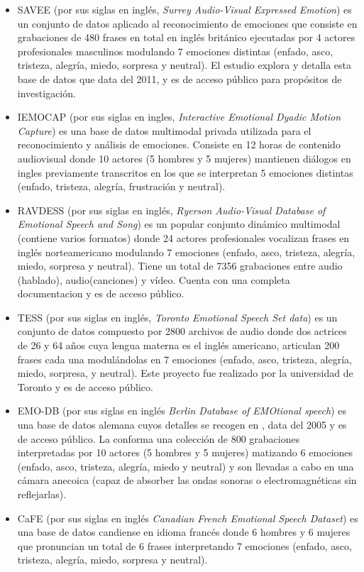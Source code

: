 \documentclass[11pt,a4paper,spanish]{book}
\begin{document}
	\begin{itemize}
		\item SAVEE (por sus siglas en inglés, \emph{ Surrey Audio-Visual Expressed Emotion}) es un conjunto de datos aplicado al reconocimiento de emociones que consiste en grabaciones de 480 frases en total en inglés británico ejecutadas por 4 actores profesionales masculinos modulando 7 emociones distintas (enfado, asco, tristeza, alegría, miedo, sorpresa y neutral). El estudio \cite{SAVEEdataset} explora y detalla esta base de datos que data del 2011, y es de acceso público para propósitos de investigación.
		
		\item IEMOCAP (por sus siglas en ingles, \emph{Interactive Emotional Dyadic Motion Capture}) es una base de datos multimodal privada utilizada para el reconocimiento y análisis de emociones. Consiste en 12 horas de contenido audiovisual donde 10 actores (5 hombres y 5 mujeres) mantienen diálogos en ingles previamente transcritos en los que se interpretan 5 emociones distintas (enfado, tristeza, alegría, frustración y neutral).
		
		\item RAVDESS (por sus siglas en inglés, \emph{Ryerson Audio-Visual Database of Emotional Speech and Song}) es un popular conjunto dinámico multimodal (contiene varios formatos) donde 24 actores profesionales vocalizan frases en inglés norteamericano modulando 7 emociones (enfado, asco, tristeza, alegría, miedo, sorpresa y neutral). Tiene un total de 7356 grabaciones entre audio (hablado), audio(canciones) y vídeo. Cuenta con una completa documentacion \cite{Livingstone2018} y es de acceso público.
		
		\item TESS (por sus siglas en inglés, \emph{Toronto Emotional Speech Set data}) es un conjunto de datos compuesto por 2800 archivos de audio donde dos actrices de 26 y 64 años cuya lengua materna es el inglés americano, articulan 200 frases cada una modulándolas en 7 emociones (enfado, asco, tristeza, alegría, miedo, sorpresa, y neutral). Este proyecto fue realizado por la universidad de Toronto \cite{SP2/E8H2MF_2020} y es de acceso público.
		
		\item EMO-DB (por sus siglas en inglés \emph{Berlin Database of EMOtional speech}) es una base de datos alemana cuyos detalles se recogen en \cite{emodb2005}, data del 2005 y es de acceso público. La conforma una colección de 800 grabaciones interpretadas por 10 actores (5 hombres y 5 mujeres) matizando 6 emociones (enfado, asco, tristeza, alegría, miedo y neutral) y son llevadas a cabo en una cámara anecoica (capaz de absorber las ondas sonoras o electromagnéticas sin reflejarlas).
		
		\item CaFE (por sus siglas en inglés \emph{Canadian French Emotional Speech Dataset}) es una base de datos candiense en idioma francés donde 6 hombres y 6 mujeres que pronuncian un total de 6 frases interpretando 7 emociones  (enfado, asco, tristeza, alegría, miedo, sorpresa y neutral).
		
	\end{itemize}
\end{document}
